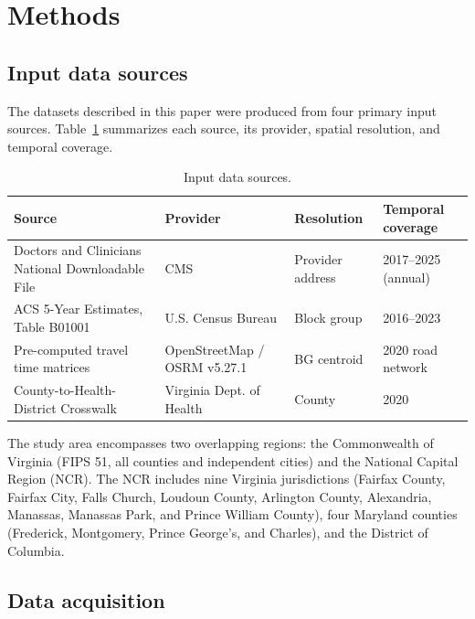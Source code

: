 \documentclass{CUP-JNL-DAP}%
\begin{document}

\section{Methods}

\subsection{Input data sources}

The datasets described in this paper were produced from four primary input sources. Table~\ref{tab:sources} summarizes each source, its provider, spatial resolution, and temporal coverage.

\begin{table}[ht]
\centering
\caption{Input data sources.}
\label{tab:sources}
\footnotesize
\begin{tabularx}{\textwidth}{XXlX}
\toprule
Source & Provider & Resolution & Temporal coverage \\
\midrule
Doctors and Clinicians National Downloadable File & CMS & Provider address & 2017--2025 (annual) \\
ACS 5-Year Estimates, Table B01001 & U.S. Census Bureau & Block group & 2016--2023 \\
Pre-computed travel time matrices & OpenStreetMap / OSRM v5.27.1 & BG centroid & 2020 road network \\
County-to-Health-District Crosswalk & Virginia Dept. of Health & County & 2020 \\
\bottomrule
\end{tabularx}
\end{table}

The study area encompasses two overlapping regions: the Commonwealth of Virginia (FIPS 51, all counties and independent cities) and the National Capital Region (NCR). The NCR includes nine Virginia jurisdictions (Fairfax County, Fairfax City, Falls Church, Loudoun County, Arlington County, Alexandria, Manassas, Manassas Park, and Prince William County), four Maryland counties (Frederick, Montgomery, Prince George's, and Charles), and the District of Columbia.

\subsection{Data acquisition}
\end{document}
